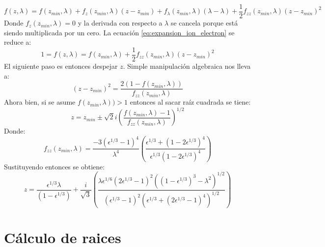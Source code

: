 \documentclass[12pt]{article}
\begin{document}
\begin{equation}
\label{eq:expansion_ion_electron}
f(z,\lambda)=f(z_{min},\lambda) + f_z(z_{min},\lambda)(z-z_{min}) + f_{\lambda}(z_{min},\lambda)(\lambda-\lambda)+ \frac{1}{2}f_{zz}(z_{min},\lambda)(z-z_{min})^2
\end{equation}
Donde $f_z(z_{min},\lambda)=0$ y la derivada con respecto a $\lambda$ se cancela porque está siendo multiplicada por un cero. La ecuación \ref{eq:expansion_ion_electron} se reduce a:
\begin{equation}
\label{eq:reduc_ion_electron}
1=f(z,\lambda)=f(z_{min},\lambda)+ \frac{1}{2}f_{zz}(z_{min},\lambda)(z-z_{min})^2
\end{equation}
El siguiente paso es entonces despejar $z$. Simple manipulación algebraica nos lleva a:
\begin{equation}
(z-z_{min})^2 =\frac{2(1-f(z_{min},\lambda))}{f_{zz}(z_{min},\lambda)}
\end{equation}
Ahora bien, si se asume $f(z_{min},\lambda)) > 1$ entonces al sacar raíz cuadrada se tiene:
\begin{equation}
z=z_{min} \pm \sqrt{2}i\left(\frac{f(z_{min},\lambda)-1}{f_{zz}(z_{min},\lambda)} \right)^{1/2}
\end{equation}
Donde:
\begin{equation}
f_{zz}(z_{min},\lambda)=\frac{-3(\epsilon^{1/3} -1)^4}{\lambda^4}\left(\frac{\epsilon^{1/3}+(1-2\epsilon^{1/3})^4}{\epsilon^{1/3}(1-2\epsilon^{1/3})^4}\right)
\end{equation}
Sustituyendo entonces se obtiene:
\begin{equation}
z=\frac{\epsilon ^{1/3}\lambda}{(1- \epsilon^{1/3})} + \frac{i}{\sqrt{3}}\left(\frac{\lambda \epsilon^{1/6}(2\epsilon^{1/3}-1)^2((1-\epsilon^{1/3})^3-\lambda^2)^{1/2}}{(\epsilon^{1/3}-1)^2(\epsilon^{1/3}+(2\epsilon^{1/3}-1)^4)^{1/2}}\right)
\end{equation}
\appendix
{}
\section{Cálculo de raices}\label{Ap:raices}
\end{document}

